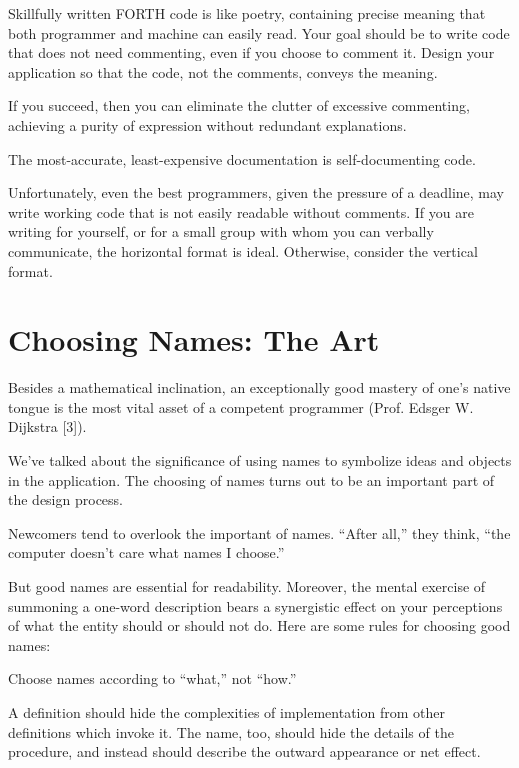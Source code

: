 Skillfully written FORTH code is like poetry, containing precise
meaning that both programmer and machine can easily read.  Your goal
should be to write code that does not need commenting, even if you
choose to comment it.  Design your application so that the code, not the
comments, conveys the meaning.

If you succeed, then you can eliminate the clutter of excessive
commenting, achieving a purity of expression without redundant
explanations.

\begin{tip}
The most-accurate, least-expensive documentation is self-documenting
code.
\end{tip}

Unfortunately, even the best programmers, given the pressure of a
deadline, may write working code that is not easily readable without comments.
If you are writing for yourself, or for a small group with whom
you can verbally communicate, the horizontal format is ideal.  Otherwise,
consider the vertical format.

\section{Choosing Names: The Art}

\begin{tfquot}
Besides a mathematical inclination, an exceptionally good mastery of one's
native tongue is the most vital asset of a competent programmer (Prof.
Edsger W. Dijkstra [3]).
\end{tfquot}
We've talked about the significance of using names to symbolize ideas
and objects in the application.  The choosing of names turns out to be an
important part of the design process.

Newcomers tend to overlook the important of names.  ``After all,''
they think, ``the computer doesn't care what names I choose.''

But good names are essential for readability.  Moreover, the mental
exercise of summoning a one-word description bears a synergistic effect
on your perceptions of what the entity should or should not do.
Here are some rules for choosing good names:

\begin{tip}
Choose names according to ``what,'' not ``how.''
\end{tip}
A definition should hide the complexities of implementation from other
definitions which invoke it.  The name, too, should hide the details of the
procedure, and instead should describe the outward appearance or net
effect.

